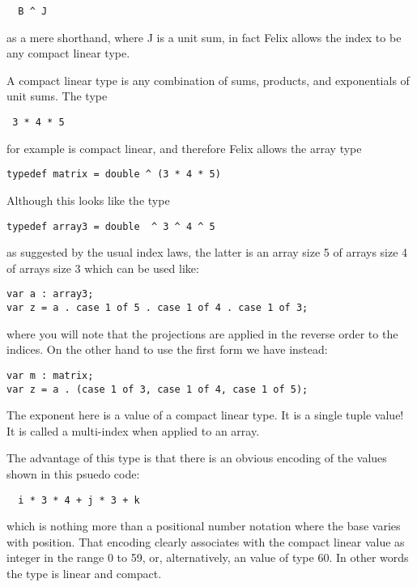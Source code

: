 \documentclass[oneside]{book}
\begin{document}
\begin{verbatim}
  B ^ J
\end{verbatim}

as a mere shorthand, where J is a unit sum, in fact Felix allows
the index to be any compact linear type.

A compact linear type is any combination of sums, products,
and exponentials of unit sums. The type

\begin{verbatim}
 3 * 4 * 5
\end{verbatim}

for example is compact linear, and therefore Felix allows the array type

\begin{verbatim}
typedef matrix = double ^ (3 * 4 * 5)
\end{verbatim}

Although this looks like the type

\begin{verbatim}
typedef array3 = double  ^ 3 ^ 4 ^ 5
\end{verbatim}

as suggested by the usual index laws, the latter is an array size 5 of
arrays size 4 of arrays size 3 which can be used like:

\begin{verbatim}
var a : array3;
var z = a . case 1 of 5 . case 1 of 4 . case 1 of 3;
\end{verbatim}

where you will note that the projections are applied in the reverse
order to the indices. On the other hand to use the first form we have
instead:

\begin{verbatim}
var m : matrix;
var z = a . (case 1 of 3, case 1 of 4, case 1 of 5);
\end{verbatim}

The exponent here is a value of a compact linear type.
It is a single tuple value! It is called a multi-index
when applied to an array.

The advantage of this type is that there is an obvious
encoding of the values shown in this psuedo code:

\begin{verbatim}
  i * 3 * 4 + j * 3 + k
\end{verbatim}

which is nothing more than a positional number notation where the
base varies with position. That encoding clearly associates
with the compact linear value as integer in the range 0 to 59,
or, alternatively, an value of type 60. In other words the type
is linear and compact.
\end{document}
